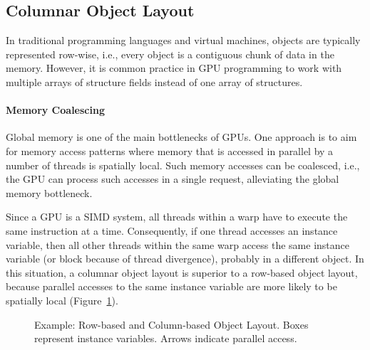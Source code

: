 \documentclass[preprint]{sigplanconf}
\begin{document}
\subsection{Columnar Object Layout}
In traditional programming languages and virtual machines, objects are typically represented row-wise, i.e., every object is a contiguous chunk of data in the memory. However, it is common practice in GPU programming to work with multiple arrays of structure fields instead of one array of structures.

\paragraph{Memory Coalescing}
Global memory is one of the main bottlenecks of GPUs. One approach is to aim for memory access patterns where memory that is accessed in parallel by a number of threads is spatially local. Such memory accesses can be coalesced, i.e., the GPU can process such accesses in a single request, alleviating the global memory bottleneck.

Since a GPU is a SIMD system, all threads within a warp have to execute the same instruction at a time. Consequently, if one thread accesses an instance variable, then all other threads within the same warp access the same instance variable (or block because of thread divergence), probably in a different object. In this situation, a columnar object layout is superior to a row-based object layout, because parallel accesses to the same instance variable are more likely to be spatially local (Figure~\ref{fig:ex_obj_layout}).

\begin{figure}[!htp]
    \centering
    
    \caption{Example: Row-based and Column-based Object Layout. Boxes represent instance variables. Arrows indicate parallel access.}
    \label{fig:ex_obj_layout}%
\end{figure}
\end{document}
